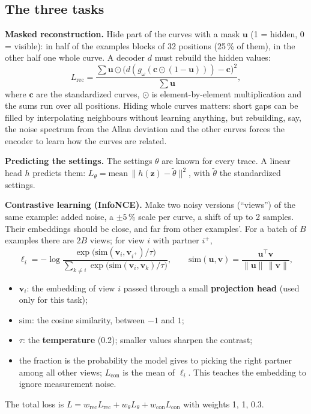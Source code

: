 \documentclass[11pt]{article}
\begin{document}
\subsection{The three tasks}
\textbf{Masked reconstruction.} Hide part of the curves with a mask $\bm u$ (1 = hidden, 0 = visible): in half of the examples
blocks of 32 positions (25\,\% of them), in the other half one whole curve. A decoder $d$ must rebuild the hidden values:
\begin{equation}
L_\text{rec} = \frac{\sum \bm u \odot \bigl(d(g_\omega(\bm c \odot (1-\bm u))) - \bm c\bigr)^2}{\sum \bm u},
\end{equation}
where $\bm c$ are the standardized curves, $\odot$ is element-by-element multiplication and the sums run over all positions.
Hiding whole curves matters: short gaps can be filled by interpolating neighbours without learning anything, but rebuilding,
say, the noise spectrum from the Allan deviation and the other curves forces the encoder to learn how the curves are related.

\textbf{Predicting the settings.} The settings $\theta$ are known for every trace. A linear head $h$ predicts them:
$L_\theta = \text{mean}\,\lVert h(\bm z) - \tilde\theta\rVert^2$, with $\tilde\theta$ the standardized settings.

\textbf{Contrastive learning (InfoNCE).} Make two noisy versions (``views'') of the same example: added noise, a $\pm5$\,\% scale per
curve, a shift of up to 2 samples. Their embeddings should be close, and far from other examples'. For a batch of $B$ examples
there are $2B$ views; for view $i$ with partner $i^+$,
\begin{equation}
\ell_i = -\log\frac{\exp\bigl(\mathrm{sim}(\bm v_i, \bm v_{i^+})/\tau\bigr)}{\sum_{k \neq i}\exp\bigl(\mathrm{sim}(\bm v_i, \bm v_k)/\tau\bigr)},
\qquad \mathrm{sim}(\bm u, \bm v) = \frac{\bm u^\top\bm v}{\lVert\bm u\rVert\,\lVert\bm v\rVert},
\end{equation}
\begin{itemize}
\item $\bm v_i$: the embedding of view $i$ passed through a small \textbf{projection head} (used only for this task);
\item $\mathrm{sim}$: the cosine similarity, between $-1$ and $1$;
\item $\tau$: the \textbf{temperature} (0.2); smaller values sharpen the contrast;
\item the fraction is the probability the model gives to picking the right partner among all other views; $L_\text{con}$ is the mean
  of $\ell_i$. This teaches the embedding to ignore measurement noise.
\end{itemize}
The total loss is $L = w_\text{rec}L_\text{rec} + w_\theta L_\theta + w_\text{con}L_\text{con}$ with weights 1, 1, 0.3.
\end{document}

